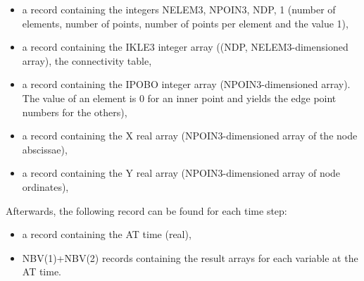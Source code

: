 \begin{itemize}
\item a record containing the integers NELEM3, NPOIN3, NDP, 1
(number of elements, number of points, number of points per element and the
value 1),

\item a record containing the IKLE3 integer array ((NDP,
NELEM3-dimensioned array), the connectivity table,

\item a record containing the IPOBO integer array (NPOIN3-dimensioned
array). The value of an element is 0 for an inner point and yields the edge
point numbers for the others),

\item a record containing the X real array (NPOIN3-dimensioned array of
the node abscissae),

\item a record containing the Y real array (NPOIN3-dimensioned array of
node ordinates),
\end{itemize}

Afterwards, the following record can be found for each time step:

\begin{itemize}
\item a record containing the AT time (real),

\item NBV(1)+NBV(2) records containing the
result arrays for each variable at the AT time.
\end{itemize}

